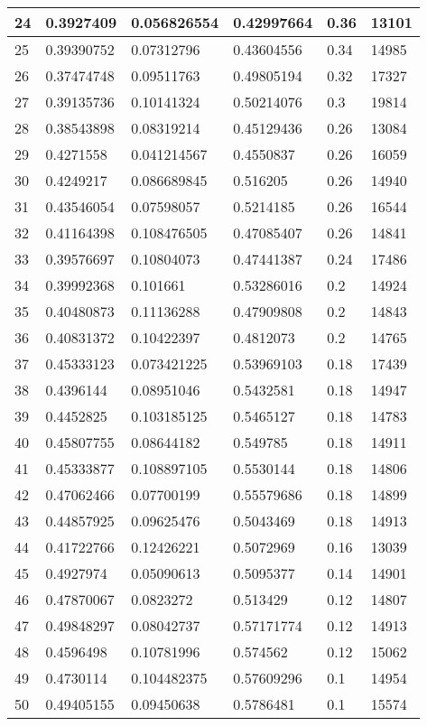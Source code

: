 \begin{longtable}{|l|l|l|l|l|l|}
24 & 0.3927409 & 0.056826554 & 0.42997664 & 0.36 & 13101 \\ \hline 
25 & 0.39390752 & 0.07312796 & 0.43604556 & 0.34 & 14985 \\ \hline 
26 & 0.37474748 & 0.09511763 & 0.49805194 & 0.32 & 17327 \\ \hline 
27 & 0.39135736 & 0.10141324 & 0.50214076 & 0.3 & 19814 \\ \hline 
28 & 0.38543898 & 0.08319214 & 0.45129436 & 0.26 & 13084 \\ \hline 
29 & 0.4271558 & 0.041214567 & 0.4550837 & 0.26 & 16059 \\ \hline 
30 & 0.4249217 & 0.086689845 & 0.516205 & 0.26 & 14940 \\ \hline 
31 & 0.43546054 & 0.07598057 & 0.5214185 & 0.26 & 16544 \\ \hline 
32 & 0.41164398 & 0.108476505 & 0.47085407 & 0.26 & 14841 \\ \hline 
33 & 0.39576697 & 0.10804073 & 0.47441387 & 0.24 & 17486 \\ \hline 
34 & 0.39992368 & 0.101661 & 0.53286016 & 0.2 & 14924 \\ \hline 
35 & 0.40480873 & 0.11136288 & 0.47909808 & 0.2 & 14843 \\ \hline 
36 & 0.40831372 & 0.10422397 & 0.4812073 & 0.2 & 14765 \\ \hline 
37 & 0.45333123 & 0.073421225 & 0.53969103 & 0.18 & 17439 \\ \hline 
38 & 0.4396144 & 0.08951046 & 0.5432581 & 0.18 & 14947 \\ \hline 
39 & 0.4452825 & 0.103185125 & 0.5465127 & 0.18 & 14783 \\ \hline 
40 & 0.45807755 & 0.08644182 & 0.549785 & 0.18 & 14911 \\ \hline 
41 & 0.45333877 & 0.108897105 & 0.5530144 & 0.18 & 14806 \\ \hline 
42 & 0.47062466 & 0.07700199 & 0.55579686 & 0.18 & 14899 \\ \hline 
43 & 0.44857925 & 0.09625476 & 0.5043469 & 0.18 & 14913 \\ \hline 
44 & 0.41722766 & 0.12426221 & 0.5072969 & 0.16 & 13039 \\ \hline 
45 & 0.4927974 & 0.05090613 & 0.5095377 & 0.14 & 14901 \\ \hline 
46 & 0.47870067 & 0.0823272 & 0.513429 & 0.12 & 14807 \\ \hline 
47 & 0.49848297 & 0.08042737 & 0.57171774 & 0.12 & 14913 \\ \hline 
48 & 0.4596498 & 0.10781996 & 0.574562 & 0.12 & 15062 \\ \hline 
49 & 0.4730114 & 0.104482375 & 0.57609296 & 0.1 & 14954 \\ \hline 
50 & 0.49405155 & 0.09450638 & 0.5786481 & 0.1 & 15574 \\ \hline 
\end{longtable}